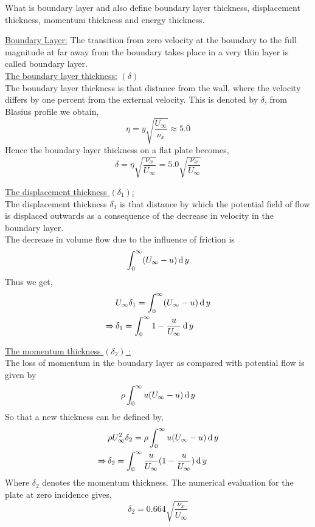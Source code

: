 \documentclass[../main-sheet.tex]{subfiles}
\begin{document}
\begin{prob}
    What is boundary layer and also define boundary layer thickness, displacement thickness, momentum thickness and energy thickness.
\end{prob}
\begin{soln}
    \underline{Boundary Layer:} The transition from zero velocity at the boundary to the full magnitude at far away from the boundary takes place in a very thin layer is called boundary layer.\\

    \underline{The boundary layer thickness:} \((\delta)\)\\
    The boundary layer thickness is that distance from the wall, where the velocity differs by one percent from the external velocity. This is denoted by \(\delta\), from Blasius profile we obtain,
    \[\eta=y\sqrt{\frac{U_\infty}{\nu_x}} \approx 5.0\]
    Hence the boundary layer thickness on a flat plate becomes,
    \[\delta=\eta\sqrt{\frac{\nu_x }{U_\infty}}=5.0\sqrt{\frac{\nu_x }{U_\infty}}\]

    \underline{The displacement thickness \((\delta_1)\):}\\
    The displacement thickness \(\delta_1\) is that distance by which the potential field of flow is displaced outwards as a consequence of the decrease in velocity in the boundary layer.\\
    The decrease in volume flow due to the influence of friction is
    \[\int_0^\infty (U_\infty-u )\,\mathrm{d}\, y\]
    Thus we get, 
    \begin{align*}
        & U_\infty \delta_1=\int_0^\infty (U_\infty-u )\,\mathrm{d}\, y\\
        \Rightarrow\,& \delta_1=\int_0^\infty 1-\frac{u}{U_\infty } \,\mathrm{d}\, y
    \end{align*}

    \underline{The momentum thickness \((\delta_2)\) :}\\
    The loss of momentum in the boundary layer as compared with potential flow is given by
    \[\rho\int_{0}^{\infty}u(U_\infty-u )\,\mathrm{d}\, y\]
    So that a new thickness can be defined by,
    \begin{align*}
        &\rho U_\infty^2 \delta_2 =\rho\int_{0}^{\infty}u(U_\infty-u )\,\mathrm{d}\, y\\
        \Rightarrow\,&\delta_2 =\int_{0}^{\infty}\frac{u}{U_\infty}(1-\frac{u}{U_\infty})\,\mathrm{d}\, y
    \end{align*}
    Where \(\delta_2\) denotes the momentum thickness. The numerical evaluation for the plate at zero incidence gives,
    \[\delta_2=0.664\sqrt{\frac{\nu_x }{U_\infty}}\]
    

\end{soln}
\end{document}
